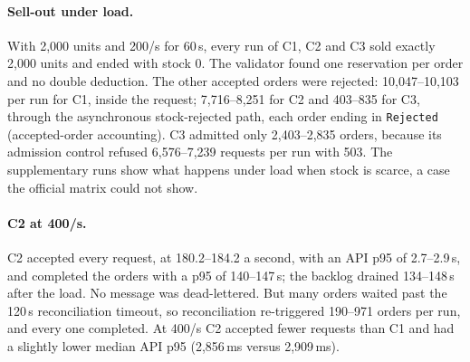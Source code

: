 \documentclass[a4paper]{report}
\begin{document}
\paragraph{Sell-out under load.} With 2,000 units and 200/s for 60\,s, every run
of C1, C2 and C3 sold exactly 2,000 units and ended with stock 0. The validator
found one reservation per order and no double deduction. The other accepted
orders were rejected: 10,047--10,103 per run for C1, inside the request;
7,716--8,251 for C2 and 403--835 for C3, through the asynchronous stock-rejected
path, each order ending in \texttt{Rejected} (accepted-order accounting). C3
admitted only 2,403--2,835 orders, because its admission control refused
6,576--7,239 requests per run with 503. The supplementary runs show what
happens under load when stock is scarce, a case the official matrix could not
show.

\paragraph{C2 at 400/s.} C2 accepted every request, at 180.2--184.2 a second,
with an API p95 of 2.7--2.9\,s, and completed the orders with a p95 of
140--147\,s; the backlog drained 134--148\,s after the load. No message was
dead-lettered. But many orders waited past the 120\,s reconciliation timeout, so
reconciliation re-triggered 190--971 orders per run, and every one completed.
At 400/s C2 accepted fewer requests than C1 and had a slightly lower median
API p95 (2,856\,ms versus 2,909\,ms).

\begin{table}[!hb]
\centering
\scriptsize
\setlength{\tabcolsep}{3pt}
\caption{Supplementary runs on a second host pair (not pooled
with the official tables). Accepted counts the 2xx responses, which equal the
orders in the database in every run. Sold is the units reserved; Rejected is the
accepted orders that got no unit; Stock left is the final stock. Completion
latency is the time from acceptance to \texttt{CompletedAt} for orders that
reach \texttt{Completed} in the asynchronous configurations. Checks
counts the runs in which every validator check held. Cells: median of 3 runs
(range); Achieved, Sold and Stock left show the median only. The values
come from the supplementary-run records.}
\label{tab:results-supp}
\end{table}

\FloatBarrier
\end{document}
